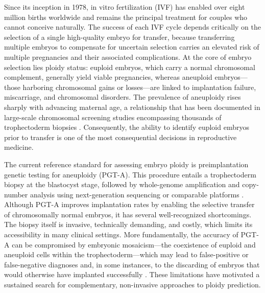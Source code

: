 \documentclass[11pt]{article}
\begin{document}
Since its inception in 1978, in vitro fertilization (IVF) has enabled over eight million births worldwide and remains the principal treatment for couples who cannot conceive naturally. The success of each IVF cycle depends critically on the selection of a single high-quality embryo for transfer, because transferring multiple embryos to compensate for uncertain selection carries an elevated risk of multiple pregnancies and their associated complications. At the core of embryo selection lies ploidy status: euploid embryos, which carry a normal chromosomal complement, generally yield viable pregnancies, whereas aneuploid embryos---those harboring chromosomal gains or losses---are linked to implantation failure, miscarriage, and chromosomal disorders. The prevalence of aneuploidy rises sharply with advancing maternal age, a relationship that has been documented in large-scale chromosomal screening studies encompassing thousands of trophectoderm biopsies \citep{franasiak2014aneuploidy}. Consequently, the ability to identify euploid embryos prior to transfer is one of the most consequential decisions in reproductive medicine.

The current reference standard for assessing embryo ploidy is preimplantation genetic testing for aneuploidy (PGT-A). This procedure entails a trophectoderm biopsy at the blastocyst stage, followed by whole-genome amplification and copy-number analysis using next-generation sequencing or comparable platforms \citep{garciapascual2020ngs, friedenthal2020ngs}. Although PGT-A improves implantation rates by enabling the selective transfer of chromosomally normal embryos, it has several well-recognized shortcomings. The biopsy itself is invasive, technically demanding, and costly, which limits its accessibility in many clinical settings. More fundamentally, the accuracy of PGT-A can be compromised by embryonic mosaicism---the coexistence of euploid and aneuploid cells within the trophectoderm---which may lead to false-positive or false-negative diagnoses and, in some instances, to the discarding of embryos that would otherwise have implanted successfully \citep{maxwell2016miscarriage}. These limitations have motivated a sustained search for complementary, non-invasive approaches to ploidy prediction.
\end{document}
